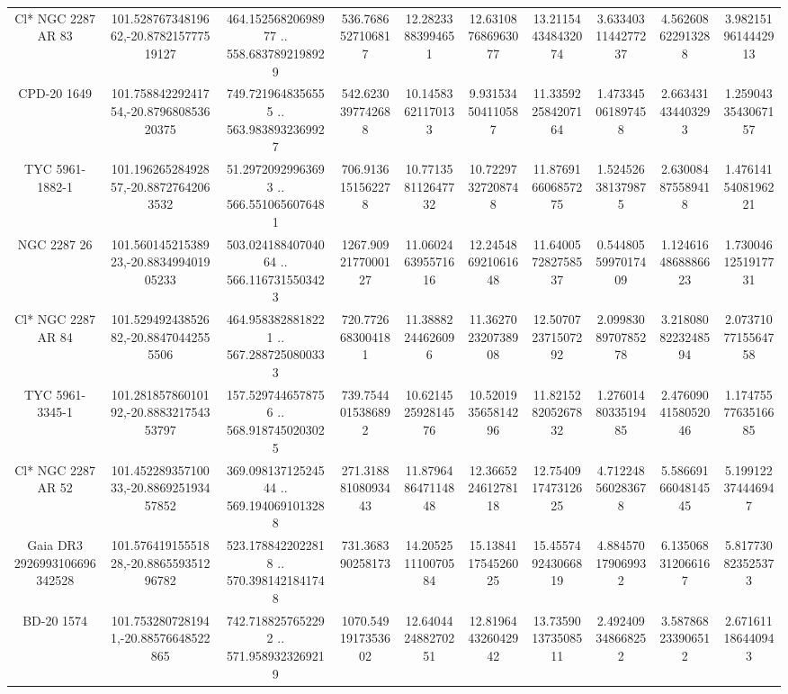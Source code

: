 \begin{table}
\begin{tabular}{cccccccccc}
Cl* NGC 2287     AR      83 & 101.52876734819662,-20.878215777519127 & 464.15256820698977 .. 558.6837892198929 & 536.7686527106817 & 12.28233883994651 & 12.631087686963077 & 13.211544348432074 & 3.6334031144277237 & 4.562608622913288 & 3.9821519614442913 \\
CPD-20  1649 & 101.75884229241754,-20.879680853620375 & 749.7219648356555 .. 563.9838932369927 & 542.6230397742688 & 10.14583621170133 & 9.931534504110587 & 11.335922584207164 & 1.473345061897458 & 2.663431434403293 & 1.2590433543067157 \\
TYC 5961-1882-1 & 101.19626528492857,-20.88727642063532 & 51.29720929963693 .. 566.5510656076481 & 706.9136151562278 & 10.771358112647732 & 10.72297327208748 & 11.876916606857275 & 1.524526381379875 & 2.630084875589418 & 1.4761415408196221 \\
NGC  2287    26 & 101.56014521538923,-20.883499401905233 & 503.02418840704064 .. 566.1167315503423 & 1267.9092177000127 & 11.060246395571616 & 12.245486921061648 & 11.640057282758537 & 0.5448055997017409 & 1.1246164868886623 & 1.7300461251917731 \\
Cl* NGC 2287     AR      84 & 101.52949243852682,-20.88470442555506 & 464.9583828818221 .. 567.2887250800333 & 720.7726683004181 & 11.38882244626096 & 11.362702320738908 & 12.507072371507292 & 2.0998308970785278 & 3.2180808223248594 & 2.0737107715564758 \\
TYC 5961-3345-1 & 101.28185786010192,-20.888321754353797 & 157.5297446578756 .. 568.9187450203025 & 739.7544015386892 & 10.621452592814576 & 10.520193565814296 & 11.821528205267832 & 1.2760148033519485 & 2.4760904158052046 & 1.1747557763516685 \\
Cl* NGC 2287     AR      52 & 101.45228935710033,-20.886925193457852 & 369.09813712524544 .. 569.1940691013288 & 271.31888108093443 & 11.879648647114848 & 12.366522461278118 & 12.754091747312625 & 4.712248560283678 & 5.5866916604814545 & 5.199122374446947 \\
Gaia DR3 2926993106696342528 & 101.57641915551828,-20.886559351296782 & 523.1788422022818 .. 570.3981421841748 & 731.368390258173 & 14.205251110070584 & 15.138411754526025 & 15.455749243066819 & 4.884570179069932 & 6.135068312066167 & 5.817730823525373 \\
BD-20  1574 & 101.7532807281941,-20.88576648522865 & 742.7188257652292 .. 571.9589323269219 & 1070.5491917353602 & 12.640442488270251 & 12.819644326042942 & 13.735901373508511 & 2.492409348668252 & 3.587868233906512 & 2.671611186440943 \\

\end{tabular}
\end{table}

